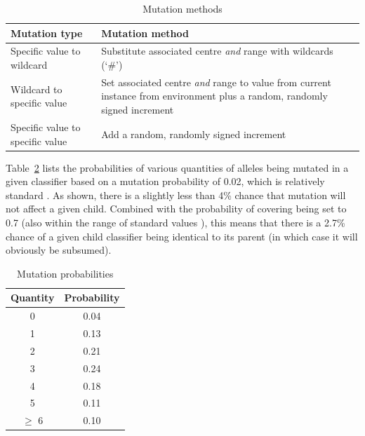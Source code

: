 \documentclass[11pt]{article}
\begin{document}
\begin{table}[!htbp]
	\centering
	\caption{Mutation methods}
	\label{tab:mutMeth}
	\begin{tabularx}{0.9\textwidth}{l p{9cm}}
		\toprule
		\textbf{Mutation type}           & \textbf{Mutation method}                                                                            \\ \midrule
		Specific value to wildcard       & Substitute associated centre \textit{and} range with wildcards (`\#')                                         \\
		Wildcard to specific value       & Set associated centre \textit{and} range to value from current instance from environment plus a random, randomly signed increment \\
		Specific value to specific value & Add a random, randomly signed increment                                                             \\ \bottomrule
	\end{tabularx}
\end{table}

Table~\ref{tab:mutProb} lists the probabilities of various quantities of alleles being mutated in a given classifier based on a mutation probability of 0.02, which is relatively standard \cite{Butz2000}. As shown, there is a slightly less than 4\% chance that mutation will not affect a given child. Combined with the probability of covering being set to 0.7 (also within the range of standard values \cite{Butz2000}), this means that there is a 2.7\% chance of a given child classifier being identical to its parent (in which case it will obviously be subsumed).

\begin{table}[!htbp]
	\centering
	\caption{Mutation probabilities}
	\label{tab:mutProb}
	\begin{tabularx}{0.3\textwidth}{cc}
		\toprule
		\textbf{Quantity} & \textbf{Probability} \\ \midrule
		        0         &         0.04         \\
		        1         &         0.13         \\
		        2         &         0.21         \\
		        3         &         0.24         \\
		        4         &         0.18         \\
		        5         &         0.11         \\
		     $\ge$ 6      &         0.10         \\ \bottomrule
	\end{tabularx}
\end{table}
\end{document}

